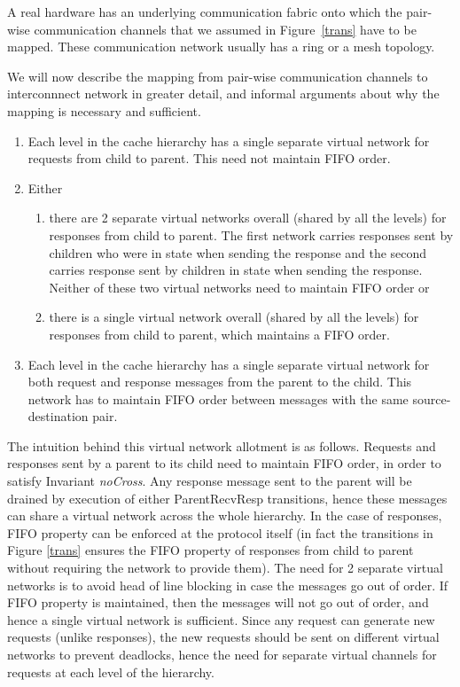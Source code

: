 A real hardware has an underlying communication fabric onto which the pair-wise
communication channels that we assumed in Figure~\ref{trans} have to be mapped.
These communication network usually has a ring or a mesh topology.

We will now describe the mapping from pair-wise communication channels
to interconnnect network in greater detail, and informal arguments
about why the mapping is necessary and sufficient.

\begin{enumerate}
\item Each level in the cache hierarchy has a single separate virtual network
for requests from child to parent. This need not maintain FIFO order.
\item Either
\begin{enumerate}
\item there are 2 separate virtual networks overall (shared by all the levels)
for responses from child to parent. The first network carries responses sent by
children who were in state \Mo{} when sending the response and the second
carries response sent by children in state \Sh{} when sending the response.
Neither of these two virtual networks need to maintain FIFO order or
\item there is a single virtual network overall (shared by all the levels) for
responses from child to parent, which maintains a FIFO order.
\end{enumerate}
\item Each level in the cache hierarchy has a single separate virtual network
for both request and response messages from the parent to the child. This
network has to maintain FIFO order between messages with the same
source-destination pair.
\end{enumerate}

The intuition behind this virtual network allotment is as follows. Requests and
responses sent by a parent to its child need to maintain FIFO order, in order
to satisfy Invariant \textit{noCross}. Any response message sent to the parent
will be drained by execution of either ParentRecvResp transitions, hence these
messages can share a virtual network across the whole hierarchy. In the case of
responses, FIFO property can be enforced at the protocol itself (in fact the
transitions in Figure \ref{trans} ensures the FIFO property of responses from
child to parent without requiring the network to provide them). The need for 2
separate virtual networks is to avoid head of line blocking in case the
messages go out of order. If FIFO property is maintained, then the messages
will not go out of order, and hence a single virtual network is sufficient.
Since any request can generate new requests (unlike responses), the new
requests should be sent on different virtual networks to prevent deadlocks,
hence the need for separate virtual channels for requests at each level of the
hierarchy.

